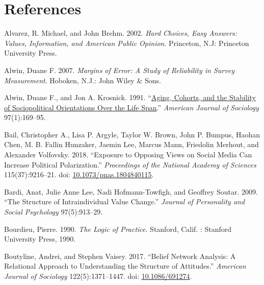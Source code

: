 \documentclass[
  12pt,
]{article}
\newlength{\cslhangindent}
\newlength{\cslentryspacingunit} %
\newenvironment{CSLReferences}[2] %
 {%
  \setlength{\parindent}{0pt}
  \ifodd #1
  \let\oldpar\par
  \def\par{\hangindent=\cslhangindent\oldpar}
  \fi
  \setlength{\parskip}{#2\cslentryspacingunit}
 }%
 {}
\begin{document}
\hypertarget{references}{%
\section{References}\label{references}}

\hypertarget{refs}{}
\begin{CSLReferences}{1}{0}
\leavevmode{}%
Alvarez, R. Michael, and John Brehm. 2002. \emph{Hard Choices, Easy
Answers: Values, Information, and {American} Public Opinion}. Princeton,
N.J: Princeton University Press.

\leavevmode{}%
Alwin, Duane F. 2007. \emph{Margins of {Error}: {A} {Study} of
{Reliability} in {Survey} {Measurement}}. Hoboken, N.J.: John Wiley \&
Sons.

\leavevmode{}%
Alwin, Duane F., and Jon A. Krosnick. 1991.
{``\href{https://www.jstor.org/stable/2781642}{Aging, {Cohorts}, and the
{Stability} of {Sociopolitical} {Orientations} {Over} the {Life}
{Span}}.''} \emph{American Journal of Sociology} 97(1):169--95.

\leavevmode{}%
Bail, Christopher A., Lisa P. Argyle, Taylor W. Brown, John P. Bumpus,
Haohan Chen, M. B. Fallin Hunzaker, Jaemin Lee, Marcus Mann, Friedolin
Merhout, and Alexander Volfovsky. 2018. {``Exposure to Opposing Views on
Social Media Can Increase Political Polarization.''} \emph{Proceedings
of the National Academy of Sciences} 115(37):9216--21. doi:
\href{https://doi.org/10.1073/pnas.1804840115}{10.1073/pnas.1804840115}.

\leavevmode{}%
Bardi, Anat, Julie Anne Lee, Nadi Hofmann-Towfigh, and Geoffrey Soutar.
2009. {``The Structure of Intraindividual Value Change.''} \emph{Journal
of Personality and Social Psychology} 97(5):913--29.

\leavevmode{}%
Bourdieu, Pierre. 1990. \emph{The Logic of Practice}. Stanford, Calif. :
Stanford University Press, 1990.

\leavevmode{}%
Boutyline, Andrei, and Stephen Vaisey. 2017. {``Belief {Network}
{Analysis}: {A} {Relational} {Approach} to {Understanding} the
{Structure} of {Attitudes}.''} \emph{American Journal of Sociology}
122(5):1371--1447. doi:
\href{https://doi.org/10.1086/691274}{10.1086/691274}.


\end{CSLReferences}
\end{document}
